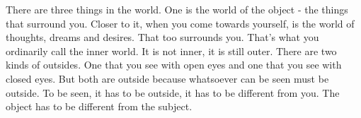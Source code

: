 \english
There are three things in the world. One is the world of the object - the things that surround you. Closer to it, when you come towards yourself, is the world of thoughts, dreams and desires. That too surrounds you. That's what you ordinarily call the inner world. It is not inner, it is still outer. There are two kinds of outsides. One that you see with open eyes and one that you see with closed eyes. But both are outside because whatsoever can be seen must be outside. To be seen, it has to be outside, it has to be different from you. The object has to be different from the subject.
